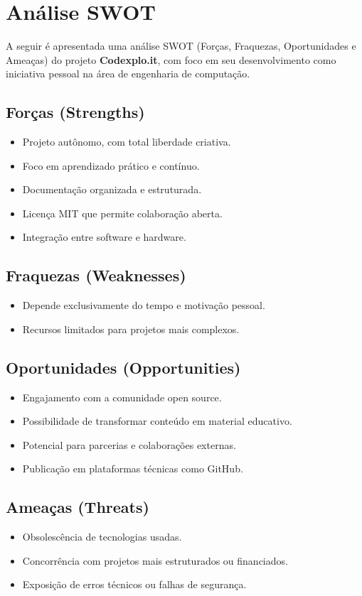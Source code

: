 \documentclass[10pt, a4paper, oneside]{article}
\begin{document}
\section{Análise SWOT}

A seguir é apresentada uma análise SWOT (Forças, Fraquezas, Oportunidades e Ameaças) do projeto \textbf{Codexplo.it}, com foco em seu desenvolvimento como iniciativa pessoal na área de engenharia de computação.

\subsection*{Forças (Strengths)}
\begin{itemize}
  \item Projeto autônomo, com total liberdade criativa.
  \item Foco em aprendizado prático e contínuo.
  \item Documentação organizada e estruturada.
  \item Licença MIT que permite colaboração aberta.
  \item Integração entre software e hardware.
\end{itemize}

\subsection*{Fraquezas (Weaknesses)}
\begin{itemize}
  \item Depende exclusivamente do tempo e motivação pessoal.
  \item Recursos limitados para projetos mais complexos.
\end{itemize}

\subsection*{Oportunidades (Opportunities)}
\begin{itemize}
  \item Engajamento com a comunidade open source.
  \item Possibilidade de transformar conteúdo em material educativo.
  \item Potencial para parcerias e colaborações externas.
  \item Publicação em plataformas técnicas como GitHub.
\end{itemize}

\subsection*{Ameaças (Threats)}
\begin{itemize}
  \item Obsolescência de tecnologias usadas.
  \item Concorrência com projetos mais estruturados ou financiados.
  \item Exposição de erros técnicos ou falhas de segurança.
\end{itemize}
\end{document}
